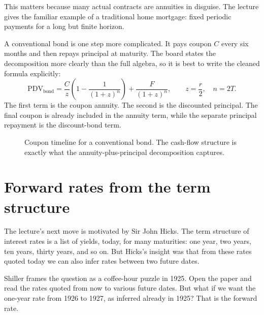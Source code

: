 This matters because many actual contracts are annuities in disguise. The lecture gives the familiar example of a traditional home mortgage: fixed periodic payments for a long but finite horizon.

A conventional bond is one step more complicated. It pays coupon \(C\) every six months and then repays principal at maturity. The board states the decomposition more clearly than the full algebra, so it is best to write the cleaned formula explicitly:
\begin{equation}
\mathrm{PDV}_{\text{bond}}=
\frac{C}{z}\left(1-\frac{1}{(1+z)^n}\right)+\frac{F}{(1+z)^n},
\qquad
z=\frac{r}{2}, \quad n=2T.
\end{equation}
The first term is the coupon annuity. The second is the discounted principal. The final coupon is already included in the annuity term, while the separate principal repayment is the discount-bond term.

\begin{figure}[t]
\centering
{}
\caption{Coupon timeline for a conventional bond. The cash-flow structure is exactly what the annuity-plus-principal decomposition captures.}
\end{figure}

\section{Forward rates from the term structure}

The lecture's next move is motivated by Sir John Hicks. The term structure of interest rates is a list of yields, today, for many maturities: one year, two years, ten years, thirty years, and so on. But Hicks's insight was that from these rates quoted today we can also infer rates between two future dates.

Shiller frames the question as a coffee-hour puzzle in 1925. Open the paper and read the rates quoted from now to various future dates. But what if we want the one-year rate from 1926 to 1927, as inferred already in 1925? That is the forward rate.


